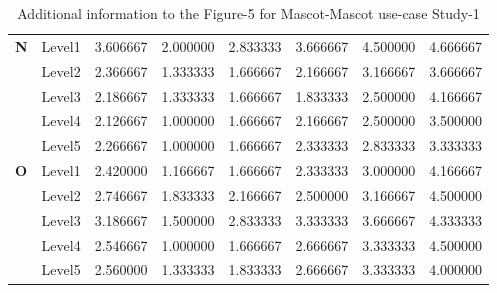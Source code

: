 \begin{table}[H]
\begin{center}
\begin{tabular}{ |p{0.5cm}| p{2cm}|p{1.5cm}|p{1.5cm}| p{1.5cm}|p{1.5cm}|p{1.5cm}| p{1.5cm}| }
 \hline 
 \hline 
 \multirow{5}{*}{\textbf{N}} 
&          Level1 & 3.606667 & 2.000000 &2.833333 &3.666667 &4.500000 &4.666667\\
&          Level2 & 2.366667 & 1.333333 &1.666667 &2.166667 &3.166667 &3.666667\\
&          Level3 & 2.186667 & 1.333333 &1.666667 &1.833333 &2.500000 &4.166667\\
&          Level4 & 2.126667 & 1.000000 &1.666667 &2.166667 &2.500000 &3.500000\\
&          Level5 & 2.266667 & 1.000000 &1.666667 &2.333333 &2.833333 &3.333333\\
 \hline 
 \hline 
 \multirow{5}{*}{\textbf{O}} 
&          Level1 & 2.420000 & 1.166667 &1.666667 &2.333333 &3.000000 &4.166667\\
&          Level2 & 2.746667 & 1.833333 &2.166667 &2.500000 &3.166667 &4.500000\\
&          Level3 & 3.186667 & 1.500000 &2.833333 &3.333333 &3.666667 &4.333333\\
&          Level4 & 2.546667 & 1.000000 &1.666667 &2.666667 &3.333333 &4.500000\\
&          Level5 & 2.560000 & 1.333333 &1.833333& 2.666667 &3.333333 &4.000000\\
 \hline 
\end{tabular}
\end{center}
\caption{Additional information to the Figure-5 for Mascot-Mascot use-case Study-1}
\end{table}

